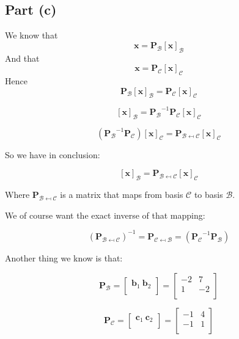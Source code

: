 \documentclass{article}
\begin{document}
\subsection{Part (c)} 


We know that
\[%
    \mathbf{x}= \mathbf{P_{\mathcal{B}}}[\mathbf{x}]_{\mathcal{B}} 
\]%
And that
\[%
    \mathbf{x}= \mathbf{P_{\mathcal{C}}}[\mathbf{x}]_{\mathcal{C}} 
\]%
Hence
\[%
    \mathbf{P_{\mathcal{B}}}[\mathbf{x}]_{\mathcal{B}} 
    =
    \mathbf{P_{\mathcal{C}}}[\mathbf{x}]_{\mathcal{C}} 
\]%

\[%
    [\mathbf{x}]_{\mathcal{B}} 
    =
    \mathbf{P_{\mathcal{B}}}^{-1}
    \mathbf{P_{\mathcal{C}}} 
    [\mathbf{x}]_{\mathcal{C}} 
\]%

\[%
    \left(
    \mathbf{P_{\mathcal{B}}}^{-1}
    \mathbf{P_{\mathcal{C}}} 
    \right)
    [\mathbf{x}]_{\mathcal{C}} 
    = 
    \mathbf{P}_{\mathcal{B}\mapsfrom \mathcal{C}}
    [\mathbf{x}]_{\mathcal{C}} 
\]%

So we have in conclusion:

\[%
    [\mathbf{x}]_{\mathcal{B}}
    =
    \mathbf{P}_{\mathcal{B}\mapsfrom \mathcal{C}} [\mathbf{x}]_{\mathcal{C}} 
\]%

Where $ \mathbf{P}_{\mathcal{B}\mapsfrom \mathcal{C}} $ is a matrix that maps
from basis $ \mathcal{C} $ to basis $ \mathcal{B} $.

We of course want the exact inverse of that mapping:

\[%
    (\mathbf{P}_{\mathcal{B}\mapsfrom \mathcal{C}})^{-1}
    = 
    \mathbf{P}_{\mathcal{C}\mapsfrom \mathcal{B}}
    = 
    \left( \mathbf{P_{\mathcal{C}}}^{-1} \mathbf{P_{\mathcal{B}}} \right)
\]%

Another thing we know is that:

\[%
    \mathbf{P}_{\mathcal{B}} 
    = 
    \begin{bmatrix} \mathbf{b}_{1} \ \mathbf{b}_{2} \\ \end{bmatrix}
    =
    \begin{bmatrix} -2 & 7 \\ 1 & -2 \\ \end{bmatrix}
\]%

\[%
    \mathbf{P}_{\mathcal{C}} 
    = 
    \begin{bmatrix} \mathbf{c}_{1} \ \mathbf{c}_{2} \\ \end{bmatrix}
    =
    \begin{bmatrix} -1 & 4 \\ -1 & 1 \\ \end{bmatrix}
\]%
\end{document}

